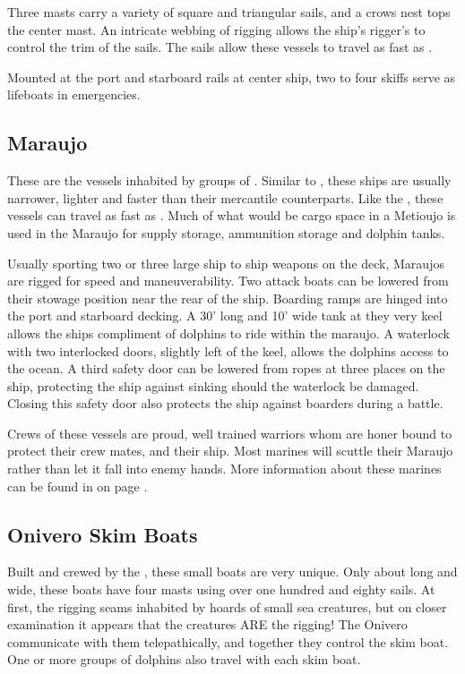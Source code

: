\begin{multicols*}{2}
Three masts carry a variety of square and triangular sails, and a crows nest tops the center mast. An intricate webbing of rigging allows the ship’s rigger’s to control the trim of the sails. The sails allow these vessels to travel as fast as .

Mounted at the port and starboard rails at center ship, two to four skiffs serve as lifeboats in emergencies.
\subsection{Maraujo}
These are the vessels inhabited by groups of . Similar to , these ships are usually narrower, lighter and faster than their mercantile counterparts. Like the , these vessels can travel as fast as . Much of what would be cargo space in a Metioujo is used in the Maraujo for supply storage, ammunition storage and dolphin tanks.

Usually sporting two or three large ship to ship weapons on the deck, Maraujos are rigged for speed and maneuverability. Two attack boats can be lowered from their stowage position near the rear of the ship. Boarding ramps are hinged into the port and starboard decking.
A 30' long and 10' wide tank at they very keel allows the ships compliment of dolphins to ride within the maraujo. A waterlock with two interlocked doors, slightly left of the keel, allows the dolphins access to the ocean. A third safety door can be lowered from ropes at three places on the ship, protecting the ship against sinking should the waterlock be damaged. Closing this safety door also protects the ship against boarders during a battle.

Crews of these vessels are proud, well trained warriors whom are honer bound to protect their crew mates, and their ship. Most marines will scuttle their Maraujo rather than let it fall into enemy hands. More information about these marines can be found in  on page .
\subsection{Onivero Skim Boats}
Built and crewed by the , these small boats are very unique. Only about  long and  wide, these boats have four masts using over one hundred and eighty sails. At first, the rigging seams inhabited by hoards of small sea creatures, but on closer examination it appears that the creatures ARE the rigging! The Onivero communicate with them telepathically, and together they control the skim boat. One or more groups of dolphins also travel with each skim boat.


\end{multicols*}
